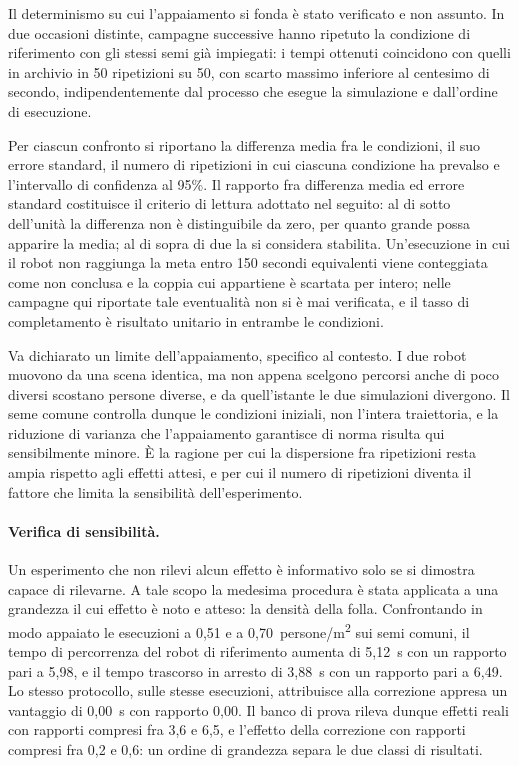 Il determinismo su cui l'appaiamento si fonda è stato verificato e non assunto. In due
occasioni distinte, campagne successive hanno ripetuto la condizione di riferimento con
gli stessi semi già impiegati: i tempi ottenuti coincidono con quelli in archivio in 50
ripetizioni su 50, con scarto massimo inferiore al centesimo di secondo, indipendentemente
dal processo che esegue la simulazione e dall'ordine di esecuzione.

Per ciascun confronto si riportano la differenza media fra le condizioni, il suo errore
standard, il numero di ripetizioni in cui ciascuna condizione ha prevalso e l'intervallo di
confidenza al 95\%. Il rapporto fra differenza media ed errore standard costituisce il
criterio di lettura adottato nel seguito: al di sotto dell'unità la differenza non è
distinguibile da zero, per quanto grande possa apparire la media; al di sopra di due la si
considera stabilita. Un'esecuzione in cui il robot non raggiunga la meta entro 150 secondi
equivalenti viene conteggiata come non conclusa e la coppia cui appartiene è scartata per
intero; nelle campagne qui riportate tale eventualità non si è mai verificata, e il tasso
di completamento è risultato unitario in entrambe le condizioni.

Va dichiarato un limite dell'appaiamento, specifico al contesto. I due robot muovono da
una scena identica, ma non appena scelgono percorsi anche di poco diversi scostano persone
diverse, e da quell'istante le due simulazioni divergono. Il seme comune controlla dunque
le condizioni iniziali, non l'intera traiettoria, e la riduzione di varianza che
l'appaiamento garantisce di norma risulta qui sensibilmente minore. È la ragione per cui
la dispersione fra ripetizioni resta ampia rispetto agli effetti attesi, e per cui il
numero di ripetizioni diventa il fattore che limita la sensibilità dell'esperimento.

\paragraph{Verifica di sensibilità.} Un esperimento che non rilevi alcun effetto è
informativo solo se si dimostra capace di rilevarne. A tale scopo la medesima procedura è
stata applicata a una grandezza il cui effetto è noto e atteso: la densità della folla.
Confrontando in modo appaiato le esecuzioni a 0,51 e a 0,70~persone/m\textsuperscript{2}
sui semi comuni, il tempo di percorrenza del robot di riferimento aumenta di 5,12~s con un
rapporto pari a 5,98, e il tempo trascorso in arresto di 3,88~s con un rapporto pari a
6,49. Lo stesso protocollo, sulle stesse esecuzioni, attribuisce alla correzione appresa
un vantaggio di 0,00~s con rapporto 0,00. Il banco di prova rileva dunque effetti reali
con rapporti compresi fra 3,6 e 6,5, e l'effetto della correzione con rapporti compresi
fra 0,2 e 0,6: un ordine di grandezza separa le due classi di risultati.


